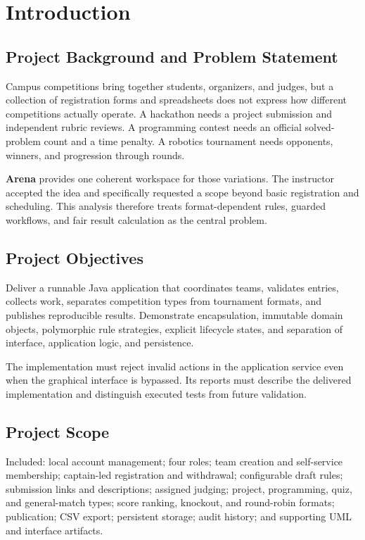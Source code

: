 \documentclass[12pt]{article}
\begin{document}
\section{Introduction}
\subsection{Project Background and Problem Statement}
Campus competitions bring together students, organizers, and judges, but a collection of registration forms and spreadsheets does not express how different competitions actually operate. A hackathon needs a project submission and independent rubric reviews. A programming contest needs an official solved-problem count and a time penalty. A robotics tournament needs opponents, winners, and progression through rounds.

\textbf{Arena} provides one coherent workspace for those variations. The instructor accepted the idea and specifically requested a scope beyond basic registration and scheduling. This analysis therefore treats format-dependent rules, guarded workflows, and fair result calculation as the central problem.
\subsection{Project Objectives}
\begin{objectivebox}
Deliver a runnable Java application that coordinates teams, validates entries, collects work, separates competition types from tournament formats, and publishes reproducible results. Demonstrate encapsulation, immutable domain objects, polymorphic rule strategies, explicit lifecycle states, and separation of interface, application logic, and persistence.
\end{objectivebox}
The implementation must reject invalid actions in the application service even when the graphical interface is bypassed. Its reports must describe the delivered implementation and distinguish executed tests from future validation.
\subsection{Project Scope}
Included: local account management; four roles; team creation and self-service membership; captain-led registration and withdrawal; configurable draft rules; submission links and descriptions; assigned judging; project, programming, quiz, and general-match types; score ranking, knockout, and round-robin formats; publication; CSV export; persistent storage; audit history; and supporting UML and interface artifacts.
\end{document}
